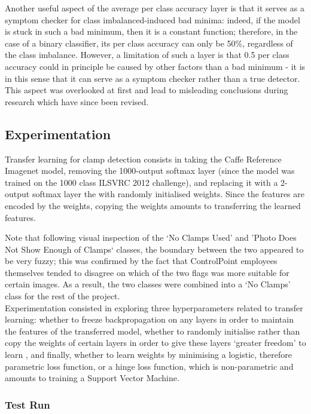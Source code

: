 \documentclass[a4paper,11pt]{article}
\begin{document}
Another useful aspect of the average per class accuracy layer is that it serves as a symptom checker for class imbalanced-induced bad minima: indeed, if the model is stuck in such a bad minimum, then it is a constant function; therefore, in the case of a binary classifier, its per class accuracy can only be 50\%, regardless of the class imbalance. However, a limitation of such a layer is that 0.5 per class accuracy could in principle be caused by other factors than a bad minimum - it is in this sense that it can serve as a symptom checker rather than a true detector. This aspect was overlooked at first and lead to misleading conclusions during research which have since been revised. 


\subsection{Experimentation}

Transfer learning for clamp detection consists in taking the Caffe Reference Imagenet model, removing the 1000-output softmax layer (since the model was trained on the 1000 class ILSVRC 2012 challenge), and replacing it with a 2-output softmax layer the with randomly initialised weights. Since the features are encoded by the weights, copying the weights amounts to transferring the learned features.

Note that following visual inspection of the `No Clamps Used' and 'Photo Does Not Show Enough of Clamps` classes, the boundary between the two appeared to be very fuzzy; this was confirmed by the fact that ControlPoint employees themselves tended to disagree on which of the two flags was more suitable for certain images. As a result, the two classes were combined into a `No Clamps' class for the rest of the project. \\

Experimentation consisted in exploring three hyperparameters related to transfer learning: whether to freeze backpropagation on any layers in order to maintain the features of the transferred model, whether to randomly initialise rather than copy the weights of certain layers in order to give these layers `greater freedom' to learn \cite{transfer-learning}, and finally, whether to learn weights by minimising a logistic, therefore parametric loss function, or a hinge loss function, which is non-parametric and amounts to training a Support Vector Machine. 


\subsubsection{Test Run}
\end{document}
